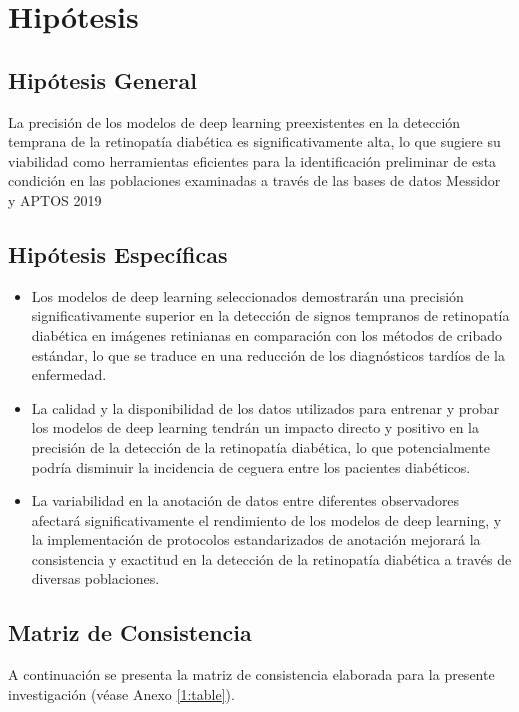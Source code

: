 \section{Hipótesis}

\subsection{Hipótesis General}
\newcommand{\HipotesisGeneral}{
	La precisión de los modelos de deep learning preexistentes en la detección temprana de la retinopatía diabética es significativamente alta, lo que sugiere su viabilidad como herramientas eficientes para la identificación preliminar de esta condición en las poblaciones examinadas a través de las bases de datos Messidor y APTOS 2019
}
\HipotesisGeneral
\subsection{Hipótesis Específicas}
\newcommand{\Hone}{
	 Los modelos de deep learning seleccionados demostrarán una precisión significativamente superior en la detección de signos tempranos de retinopatía diabética en imágenes retinianas en comparación con los métodos de cribado estándar, lo que se traduce en una reducción de los diagnósticos tardíos de la enfermedad.
}
\newcommand{\Htwo}{
	 La calidad y la disponibilidad de los datos utilizados para entrenar y probar los modelos de deep learning tendrán un impacto directo y positivo en la precisión de la detección de la retinopatía diabética, lo que potencialmente podría disminuir la incidencia de ceguera entre los pacientes diabéticos.
}
\newcommand{\Hthree}{
	La variabilidad en la anotación de datos entre diferentes observadores afectará significativamente el rendimiento de los modelos de deep learning, y la implementación de protocolos estandarizados de anotación mejorará la consistencia y exactitud en la detección de la retinopatía diabética a través de diversas poblaciones.
}
\newcommand{\Hfour}{
	cv
}
\newcommand{\Hfive}{
	xws
}
\begin{itemize}
	\item \Hone
	\item \Htwo
	\item \Hthree

\end{itemize}

\subsection{Matriz de Consistencia}
A continuación se presenta la matriz de consistencia elaborada para la presente investigación (véase Anexo \ref{1:table}).
